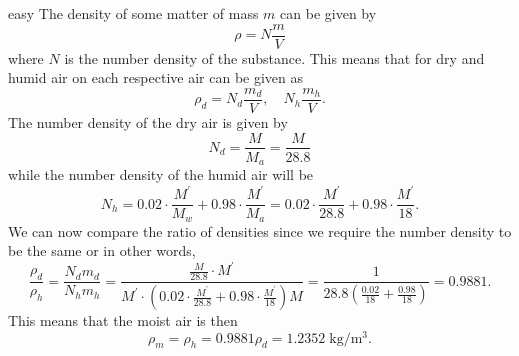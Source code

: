 \begin{solution}{easy}
The density of some matter of mass $m$ can be given by 
\[\rho = N \frac{m}{V} \]
where $N$ is the number density of the substance. This means that for dry and humid air on each respective air can be given as 
\[\rho_d = N_d \frac{m_d}{V}, \quad N_h \frac{m_h}{V}.\]
The number density of the dry air is given by 
\[N_d = \frac{M}{M_a} = \frac{M}{28.8}\]
while the number density of the humid air will be 
\[N_h = 0.02\cdot \frac{M^{\prime}}{M_w} + 0.98\cdot \frac{M^{\prime}}{M_a} = 0.02\cdot \frac{M^{\prime}}{28.8} + 0.98\cdot \frac{M^{\prime}}{18}.\]
We can now compare the ratio of densities since we require the number density to be the same or in other words, 
\[\frac{\rho_d}{\rho_h} = \frac{N_d m_d}{N_h m_h} = \frac{\frac{M}{28.8}\cdot M^{\prime}}{M^{\prime}\cdot \left(0.02\cdot \frac{M^{\prime}}{28.8} + 0.98\cdot \frac{M^{\prime}}{18}\right)M} = \frac{1}{28.8\left(\frac{0.02}{18} + \frac{0.98}{18}\right)} = 0.9881.\]
This means that the moist air is then 
\[\rho_m = \rho_h = 0.9881 \rho_d = 1.2352\;\mathrm{kg/m^3}.\]
\end{solution}